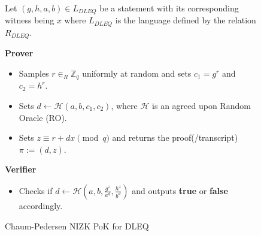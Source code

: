 \begin{figure}[ht]
    \centering
    \begin{tcolorbox}[title=\textbf{Chaum-Pedersen Protocol for DLEQ}, width=0.9\textwidth, colframe=blue!75!black, colback=blue!10, sharp corners]
        Let $(g,h,a,b)\in L_{DLEQ}$ be a statement with its corresponding witness being $x$ where $L_{DLEQ}$
        is the language defined by the relation $R_{DLEQ}$.
        
        \vspace{0.5em}
        \textbf{Prover}
        \begin{itemize}
            \item Samples $r\in_{R}\mathbb{Z}_q$ uniformly at random and sets 
                $c_1=g^r$ and $c_2=h^r$.
            \item Sets $d\leftarrow \mathcal{H}(a,b,c_1,c_2)$, where $\mathcal{H}$ is 
                an agreed upon Random Oracle (RO).
            \item Sets $z\equiv r+dx \pmod{q}$ and returns the proof(/transcript) $\pi:= (d,z)$.
        \end{itemize}
        
        \vspace{0.5em}
        \textbf{Verifier}
        \begin{itemize}
            \item Checks if $d\leftarrow \mathcal{H}(a,b,\frac{g^z}{a^d},\frac{h^z}{b^d})$ 
                and outputs \textbf{true} or \textbf{false} accordingly.
        \end{itemize}
    \end{tcolorbox}
    \caption{Chaum-Pedersen NIZK PoK for DLEQ}
    \label{fig:chaum-pedersen}
\end{figure}
